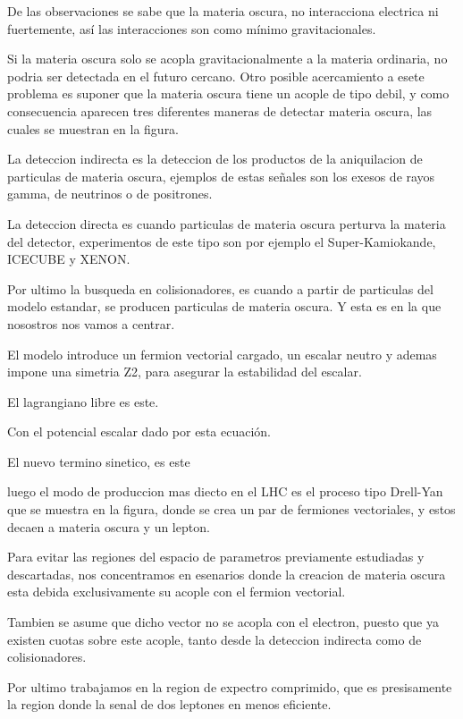 \documentclass[12pt,letterpaper]{article}
\newcounter{example}[enumi]
\begin{document}
	
	\begin{tcolorbox}[title= Slide \arabic{example} ]
	De las observaciones se sabe que la materia oscura, no interacciona electrica ni fuertemente, así las interacciones son como mínimo gravitacionales. 

	Si la materia oscura solo se acopla gravitacionalmente a la materia ordinaria, no podria ser detectada en el futuro cercano. Otro posible acercamiento a esete problema es suponer que la materia oscura tiene un acople de tipo debil, y como consecuencia aparecen tres diferentes maneras de detectar materia oscura, las cuales se muestran en la figura.

	La deteccion indirecta es la deteccion de los productos de la aniquilacion de particulas de materia oscura, ejemplos de estas señales son los exesos de rayos gamma, de neutrinos o  de positrones.

	La deteccion directa es cuando particulas de materia oscura perturva la materia del detector, experimentos de este tipo son por ejemplo el Super-Kamiokande, ICECUBE y XENON.
	
	Por ultimo la busqueda en colisionadores, es cuando a partir de particulas del modelo estandar, se producen particulas de materia oscura. Y esta es en la que nosostros nos vamos a centrar.
	\end{tcolorbox}

	\begin{tcolorbox}[title= Slide \arabic{example} ]
	El modelo introduce un fermion vectorial cargado, un escalar neutro y ademas impone una simetria Z2, para asegurar la estabilidad del escalar.
	
	El lagrangiano libre es este.
	
	Con el potencial escalar dado por esta ecuación.
	\end{tcolorbox}

	\begin{tcolorbox}[title= Slide \arabic{example} ]%
	El nuevo termino sinetico, es este
	
	luego el modo de produccion mas diecto en el LHC es el proceso tipo Drell-Yan que se muestra en la figura, donde se crea un par de fermiones vectoriales, y estos decaen a materia oscura y un lepton.
		
	\end{tcolorbox}

	\begin{tcolorbox}[title= Slide \arabic{example} ]
	Para evitar las regiones del espacio de parametros previamente estudiadas y descartadas, nos concentramos en esenarios donde la creacion de materia oscura esta debida exclusivamente su acople con el fermion vectorial.
	
	Tambien se asume que dicho vector no se acopla con el electron, puesto que ya existen cuotas sobre este acople, tanto desde la deteccion indirecta como de colisionadores.
	
	Por ultimo trabajamos en la region de expectro comprimido, que es presisamente la region donde la senal de dos leptones en menos eficiente.
	
	\end{tcolorbox}
	
\end{document}
